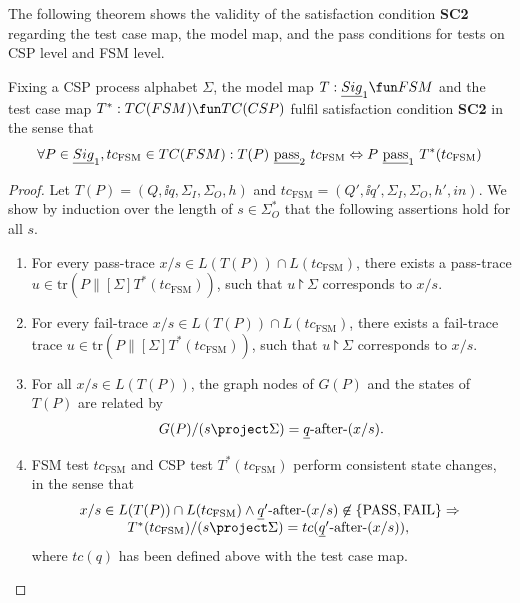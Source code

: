 The following theorem shows the validity of the satisfaction condition {\bf SC2}
regarding the test case map, the model map, and the pass conditions for tests on CSP level and FSM level.

\begin{theorem}
Fixing a CSP process alphabet $\Sigma$, the model map 
$T : \underline{Sig}_1 \fun FSM$ and the test case map $T^*:TC(FSM) \fun TC(CSP)$ fulfil satisfaction condition {\bf SC2} in the sense that
$$
\forall P\in \underline{Sig}_1, tc_\text{FSM}\in TC(FSM): T(P)\ \underline{\text{pass}}_2\ tc_\text{FSM} \Leftrightarrow
P\ \underline{\text{pass}}_1\ T^*(tc_\text{FSM})
$$
\end{theorem}
\begin{proof}
Let $T(P) = (Q,\ii q,\Sigma_I,\Sigma_O,h)$ and 
$tc_\text{FSM} = (Q',\ii q',\Sigma_I,\Sigma_O,h',in)$.
We show by induction over the length of $s\in\Sigma_O^*$ that the following 
assertions hold for all $s$.
\begin{enumerate}
\item For every pass-trace $x/s \in L(T(P)) \cap L(tc_\text{FSM})$, 
there exists a pass-trace $u \in \text{tr}(P\parallel[\Sigma] T^*(tc_\text{FSM}))$, such that
$u\project\Sigma$ corresponds to $x/s$.

\item For every fail-trace  $x/s \in L(T(P)) \cap L(tc_\text{FSM})$, 
there exists a fail-trace trace 
$u \in \text{tr}(P\parallel[\Sigma] T^*(tc_\text{FSM}))$, such that
$u\project\Sigma$ corresponds to $x/s$.

\item For all $x/s\in L(T(P))$, 
the graph nodes of $G(P)$ and the states of $T(P)$ are related by
$$
\begin{array}{l}
G(P)/(s\project\Sigma) = \ii q\after (x/s).
\end{array}
$$

\item FSM test $tc_\text{FSM}$ and CSP test $T^*(tc_\text{FSM})$ perform consistent
state changes, in the sense that
$$
\begin{array}{l}
x/s\in L(T(P))\cap L(tc_\text{FSM}) \wedge  \ii q'\after (x/s) \not\in \{\text{PASS},\text{FAIL}\}
\Rightarrow {}
\\\tabd
T^*(tc_\text{FSM})/(s\project \Sigma) = tc(\ii q'\after (x/s)),
\end{array}
$$
where $tc(q)$ has been defined above with the test case map.

\end{enumerate}


\end{proof}
